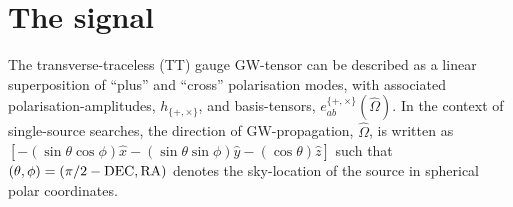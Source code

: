 \documentclass[prd,twocolumn,showpacs,nofootinbib]{revtex4}
\begin{document}
\section{The signal} \label{sec:signalmodel}






The transverse-traceless (TT) gauge GW-tensor can be described as a linear superposition of ``plus'' and ``cross'' polarisation modes, with associated polarisation-amplitudes, $h_{\{+,\times\}}$, and basis-tensors, $e_{ab}^{\{+,\times\}}(\hat\Omega)$. In the context of single-source searches, the direction of GW-propagation, $\hat\Omega$, is written as $\left[-(\sin\theta\cos\phi)\hat{x} - (\sin\theta\sin\phi)\hat{y} - (\cos\theta)\hat{z}\right]$ such that $(\theta,\phi) = (\pi/2 - {\rm DEC}, {\rm RA})$ denotes the sky-location of the source in spherical polar coordinates.
\end{document}
